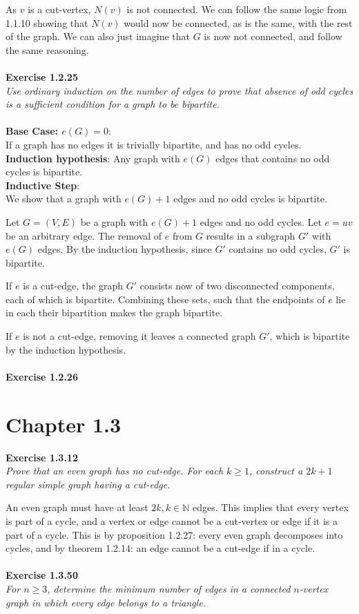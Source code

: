 As $v$ is a cut-vertex, $N(v)$ is not connected. We can follow the same logic from 1.1.10 showing that $N(v)$ would now be connected, as is the same, with the rest of the graph. We can also just imagine that $G$ is now not connected, and follow the same reasoning.
\\\\
\noindent
\textbf{Exercise 1.2.25}\\
\noindent
\textit{Use ordinary induction on the number of edges to prove that absence of odd cycles is a sufficient condition for a graph to be bipartite.}\\\\
\noindent
\textbf{Base Case: $e(G) = 0$}: \\
\noindent
If a graph has no edges it is trivially bipartite, and has no odd cycles.\\
\noindent
\textbf{Induction hypothesis}: Any graph with $e(G)$ edges that contains no odd cycles is bipartite.\\
\noindent
\textbf{Inductive Step}:\\
\noindent
We show that a graph with $e(G) + 1$ edges and no odd cycles is bipartite.

Let $G = (V,E)$ be a graph with $e(G) + 1$ edges and no odd cycles. Let $e = uv$ be an arbitrary edge. The removal of $e$ from $G$ results in a subgraph $G'$ with $e(G)$ edges. By the induction hypothesis, since $G'$ contains no odd cycles, $G'$ is bipartite.

If $e$ is a cut-edge, the graph $G'$ consists now of two disconnected components, each of which is bipartite. Combining these sets, such that the endpoints of $e$ lie in each their bipartition makes the graph bipartite.

If $e$ is not a cut-edge, removing it leaves a connected graph $G'$, which is bipartite by the induction hypothesis.
\\\\
\noindent
\textbf{Exercise 1.2.26}\\
\noindent


\section{Chapter 1.3}
\noindent
\textbf{Exercise 1.3.12}\\
\noindent
\textit{Prove that an even graph has no cut-edge. For each $k \ge 1$, construct a $2k+1$ regular simple graph having a cut-edge.}

An even graph must have at least $2k, k \in \mathbb{N}$ edges. This implies that every vertex is part of a cycle, and a vertex or edge cannot be a cut-vertex or edge if it is a part of a cycle. This is by proposition 1.2.27: every even graph decomposes into cycles, and by theorem 1.2.14: an edge cannot be a cut-edge if in a cycle.
\\\\
\noindent
\textbf{Exercise 1.3.50}\\
\noindent
\textit{For $n \ge 3$, determine the minimum number of edges in a connected $n$-vertex graph in which every edge belongs to a triangle.}

